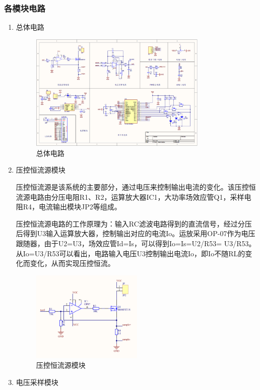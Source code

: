\documentclass{zjureport}
\begin{document}
            \subsubsection{各模块电路}
            \begin{enumerate}
                \item 总体电路
                \begin{figure}[thp]
                    \centering
                    \includegraphics[width = 0.8\textwidth]{figure/总体电路.png}
                    \caption{总体电路}
                \end{figure}
                \item 压控恒流源模块
                
                压控恒流源是该系统的主要部分，通过电压来控制输出电流的变化。该压控恒流源电路由分压电阻R1、R2，运算放大器IC1，大功率场效应管Q1，采样电阻R4，电流输出模块JP2等组成。

                压控恒流源电路的工作原理为：输入RC滤波电路得到的直流信号，经过分压后得到U3输入运算放大器，控制输出对应的电流Io。运放采用OP-07作为电压跟随器，由于U2=U3，场效应管Id=Is，可以得到Io=Is=U2/R53= U3/R53。从Io=U3/R53可以看出，电路输入电压U3控制输出电流Io，即Io不随RL的变化而变化，从而实现压控恒流。
                \newpage
                \begin{figure}[thp]
                    \centering
                    \includegraphics[width = 0.5\textwidth]{figure/压控恒流源模块.png}
                    \caption{压控恒流源模块}
                \end{figure}
                \item 电压采样模块
                

\end{enumerate}
\end{document}

